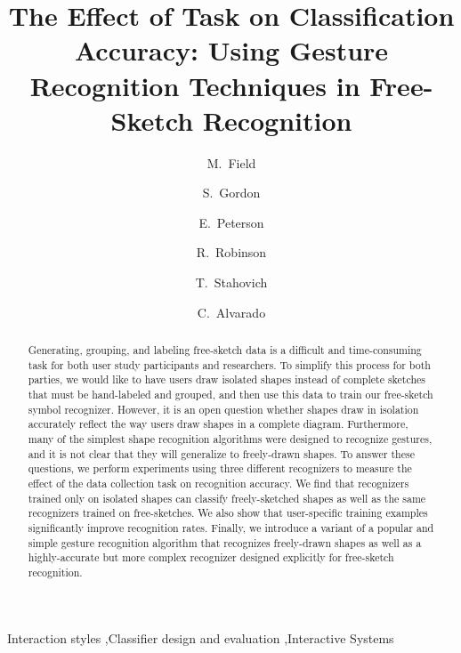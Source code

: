 \documentclass[final,5p,twocolumn]{elsarticle}
\begin{document}
\begin{frontmatter}
\title{The Effect of Task on Classification Accuracy: Using Gesture Recognition Techniques 
      in Free-Sketch Recognition}

\author[hmc]{M.~Field}

\author[hmc]{S.~Gordon}
\author[ucr]{E.~Peterson}
\author[hmc]{R.~Robinson}

\author[ucr]{T.~Stahovich}
\author[ucr]{C.~Alvarado}

\address[hmc]{Harvey Mudd College, Department of Computer Science, Claremont, California}
\address[ucr]{University of California: Riverside, Department of Mechanical Engineering, Riverside, California}

\begin{abstract}
Generating, grouping, and labeling free-sketch data is a difficult and
time-consuming task for both user study participants and
researchers. To simplify this process for both parties, we would like
to have users draw isolated shapes instead of complete sketches that
must be hand-labeled and grouped, and then use this data to train our
free-sketch symbol recognizer.  However, it is an open question
whether shapes draw in isolation accurately reflect the way users draw
shapes in a complete diagram.  Furthermore, many of the simplest shape
recognition algorithms were designed to recognize gestures, and it is
not clear that they will generalize to freely-drawn shapes.  To answer
these questions, we perform experiments using three different
recognizers to measure the effect of the data collection task on
recognition accuracy.  We find that recognizers trained only on
isolated shapes can classify freely-sketched shapes as well as the same
recognizers trained on free-sketches. We also show that user-specific
training examples significantly improve recognition rates.  Finally,
we introduce a variant of a popular and simple gesture recognition
algorithm that recognizes freely-drawn shapes as well as a
highly-accurate but more complex recognizer designed explicitly for
free-sketch recognition.


\end{abstract}

\begin{keyword}
Interaction styles \sep Classifier design and evaluation \sep Interactive Systems
\end{keyword}

\end{frontmatter}
\end{document}
